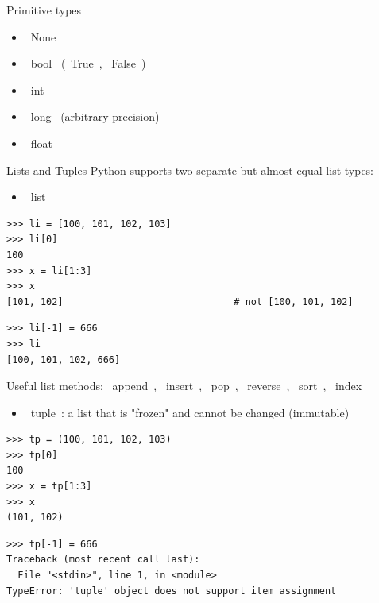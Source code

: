 \documentclass[10pt, t]{beamer}
\let\verb=\codeDelimTwiddles
\begin{document}
\begin{frame}[fragile,label=sec-2-4]{Primitive types}
 \begin{itemize}
\item \verb~None~
\item \verb~bool~ (\verb~True~, \verb~False~)
\item \verb~int~
\item \verb~long~ (arbitrary precision)
\item \verb~float~
\end{itemize}
\end{frame}
\begin{frame}[fragile,label=sec-2-5]{Lists and Tuples}
 Python supports two separate-but-almost-equal list types:
\begin{itemize}
\item \verb~list~
\end{itemize}
\lstset{language=Python,label= ,caption= ,numbers=none}
\begin{lstlisting}
>>> li = [100, 101, 102, 103]
>>> li[0]
100
>>> x = li[1:3]
>>> x
[101, 102]                              # not [100, 101, 102]
\end{lstlisting}
\pause
\lstset{language=Python,label= ,caption= ,numbers=none}
\begin{lstlisting}
>>> li[-1] = 666
>>> li
[100, 101, 102, 666]
\end{lstlisting}
Useful list methods: \verb~append~, \verb~insert~, \verb~pop~, \verb~reverse~, \verb~sort~, \verb~index~
\pause
\begin{itemize}
\item \verb~tuple~: a list that is "frozen" and cannot be changed (immutable)
\end{itemize}
\lstset{language=Python,label= ,caption= ,numbers=none}
\begin{lstlisting}
>>> tp = (100, 101, 102, 103)
>>> tp[0]
100
>>> x = tp[1:3]
>>> x
(101, 102)
\end{lstlisting}
\pause
\lstset{language=Python,label= ,caption= ,numbers=none}
\begin{lstlisting}
>>> tp[-1] = 666
Traceback (most recent call last):
  File "<stdin>", line 1, in <module>
TypeError: 'tuple' object does not support item assignment
\end{lstlisting}

\end{frame}
\end{document}
